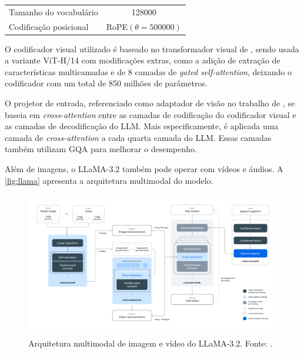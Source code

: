 \begin{table}[ht]
\begin{tabular}{l|ccc}
            Tamanho do vocabulário                 & \multicolumn{3}{c}{128000}                                                                                                                               \\
            Codificação posicional                 & \multicolumn{3}{c}{\ac{RoPE}\begin{math}(\theta = 500000)\end{math}}                                                                                     \\ \hline
      \end{tabular}
      \label{tab:llama3_architecture}
\end{table}

O codificador visual utilizado é baseado no transformador visual de \textcite{dosovitskiy2020image}, sendo usada a variante \ac{ViT}-H/14 com modificações extras, como
a adição de extração de características multicamadas e de 8 camadas de \textit{gated self-attention}, deixando o codificador com um total de 850 milhões de parâmetros.

O projetor de entrada, referenciado como adaptador de visão no trabalho de \textcite{dubey2024llama}, se baseia em \textit{cross-attention} entre as camadas de
codificação do codificador visual e as camadas de decodificação do \ac{LLM}. Mais especificamente, é aplicada uma camada de \textit{cross-attention} a cada quarta camada
do \ac{LLM}. Essas camadas também utilizam \ac{GQA} para melhorar o desempenho.

Além de imagens, o \ac{LLaMA}-3.2 também pode operar com vídeos e áudios. A \autoref{fig:llama} apresenta a arquitetura multimodal do modelo.

\begin{figure}[ht]
      \centering
      \includegraphics[width=1.0\columnwidth,keepaspectratio]{images/llama.pdf}
      \caption{\small Arquitetura multimodal de imagem e vídeo do \ac{LLaMA}-3.2. Fonte: \textcite{dubey2024llama}.}
      \label{fig:llama}
\end{figure}
